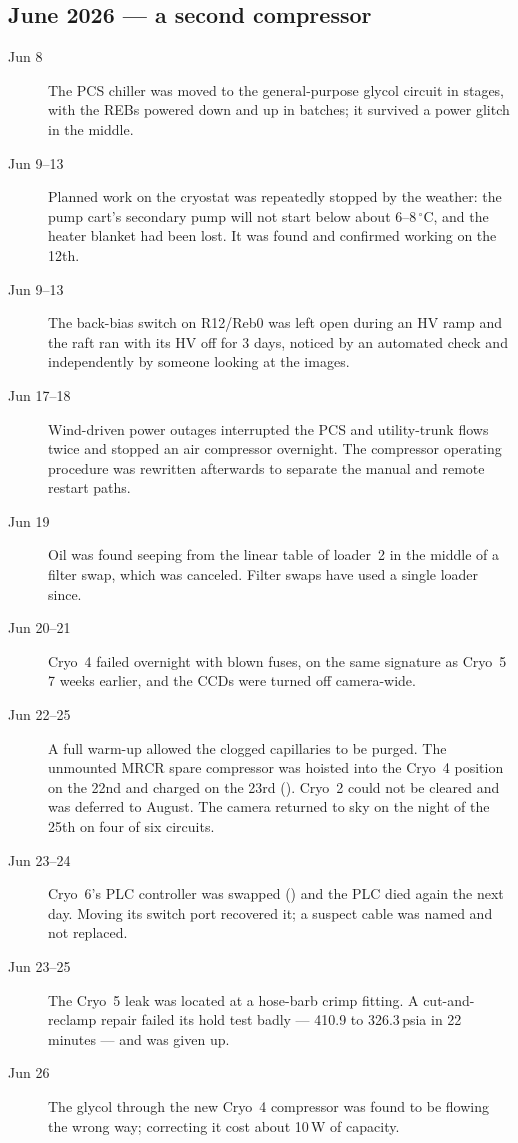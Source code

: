 \subsection{June 2026 --- a second compressor}
\begin{description}

\item[Jun 8] The PCS chiller was moved to the general-purpose glycol
  circuit in stages, with the REBs powered down and up in batches; it
  survived a power glitch in the middle.

\item[Jun 9--13] Planned work on the cryostat was repeatedly stopped by
  the weather: the pump cart's secondary pump will not start below about
  6--8\,$^{\circ}$C, and the heater blanket had been lost.  It was found
  and confirmed working on the 12th.

\item[Jun 9--13] The back-bias switch on R12/Reb0 was left open during
  an HV ramp and the raft ran with its HV off for 3 days, noticed
  by an automated check and independently by someone looking at the
  images.

\item[Jun 17--18] Wind-driven power outages interrupted the PCS and
  utility-trunk flows twice and stopped an air compressor overnight.
  The compressor operating procedure was rewritten afterwards to
  separate the manual and remote restart paths.

\item[Jun 19] Oil was found seeping from the linear table of loader~2
  in the middle of a filter swap, which was canceled.  Filter swaps
  have used a single loader since.

\item[Jun 20--21] Cryo~4 failed overnight with blown fuses, on the same
  signature as Cryo~5 7 weeks earlier, and the CCDs were turned off
  camera-wide.

\item[Jun 22--25] A full warm-up allowed the clogged capillaries to be
  purged.  The unmounted MRCR spare compressor was hoisted into the
  Cryo~4 position on the 22nd and charged on the 23rd
  ().  Cryo~2 could not be cleared and was
  deferred to August.  The camera returned to sky on the night of the
  25th on four of six circuits.

\item[Jun 23--24] Cryo~6's PLC controller was swapped
  () and the PLC died again the next day.
  Moving its switch port recovered it; a suspect cable was named and
  not replaced.

\item[Jun 23--25] The Cryo~5 leak was located at a hose-barb crimp
  fitting.  A cut-and-reclamp repair failed its hold test badly ---
  410.9 to 326.3\,psia in 22 minutes --- and was given up.

\item[Jun 26] The glycol through the new Cryo~4 compressor was found to
  be flowing the wrong way; correcting it cost about 10\,W of capacity.

\end{description}

